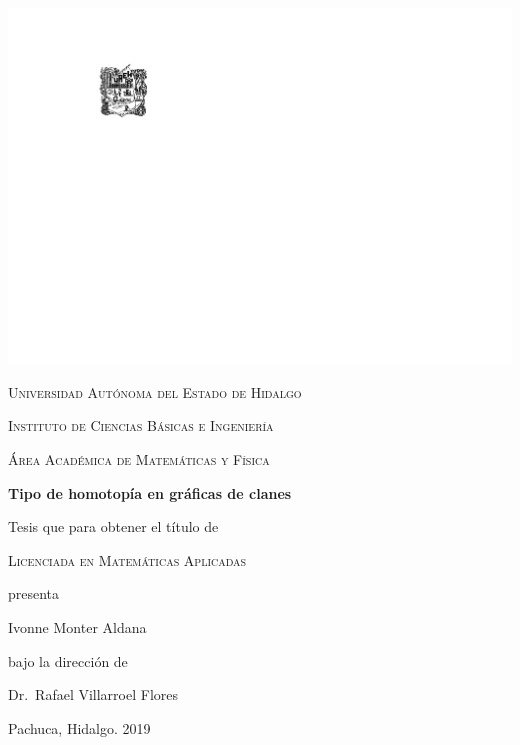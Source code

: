 \mainmatter 
\begin{titlepage}
  \begin{center}
    \null
    \vspace*{\fill}

    \includegraphics[scale=1.2,bb=55 20 0 0]{escudouaeh.pdf}

    \vspace*{\elespacio}

    \textsc{Universidad Autónoma del Estado de Hidalgo}

    \textsc{Instituto de Ciencias Básicas e Ingeniería}

    \textsc{Área Académica de Matemáticas y Física}

    \vspace*{\elespacio}

    {\Huge\bfseries Tipo de homotopía en gráficas de clanes\par}

    \vspace*{\elespacio}

    {\large Tesis que para obtener el título de}

    \vspace*{\elespacio}

    {\Large\textsc{Licenciada en Matemáticas Aplicadas}}

    \vspace*{\elespacio}

    {\large presenta}

    \vspace*{\elespacio}

    {\Huge Ivonne Monter Aldana}

    \vspace*{\elespacio}

    {\large bajo la dirección de}

    \bigskip

    {\Large Dr.~Rafael Villarroel Flores}

    \bigskip

    {Pachuca, Hidalgo. 2019}

    \vspace*{\fill}
  \end{center}
\end{titlepage}

